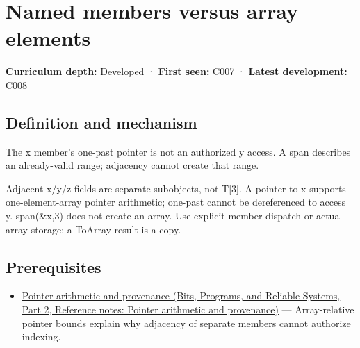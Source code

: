 \hypertarget{appendix-3f7e15effba6}{}\label{referencestart:appendix-3f7e15effba6}
\section{Named members versus array elements}\label{appendix-3f7e15effba6-named-members-versus-array-elements}

\hypertarget{appendix-3f7e15effba6-named-members-versus-array-elements}{}

\textbf{Curriculum depth:} Developed · \textbf{First seen:} C007 · \textbf{Latest development:} C008

\begin{allmightroledefinition}

\subsection{Definition and mechanism}\label{appendix-3f7e15effba6-definition-and-mechanism}

\hypertarget{appendix-3f7e15effba6-definition-and-mechanism}{}

The x member's one-past pointer is not an authorized y access. A span describes an already-valid range; adjacency cannot create that range.

\end{allmightroledefinition}

Adjacent x/y/z fields are separate subobjects, not T{[}3{]}. A pointer to x supports one-element-array pointer arithmetic; one-past cannot be dereferenced to access y. span(\&x,3) does not create an array. Use explicit member dispatch or actual array storage; a ToArray result is a copy.

\subsection{Prerequisites}\label{appendix-3f7e15effba6-prerequisites}

\hypertarget{appendix-3f7e15effba6-prerequisites}{}

\begin{itemize}
\tightlist
\item
  \href{../01-Bits-Programs-and-Reliable-Systems-P02/main.pdf\#nameddest=appendix-6af5921bc853}{Pointer arithmetic and provenance (Bits, Programs, and Reliable Systems, Part 2, Reference notes: Pointer arithmetic and provenance)} --- Array-relative pointer bounds explain why adjacency of separate members cannot authorize indexing.
\end{itemize}

